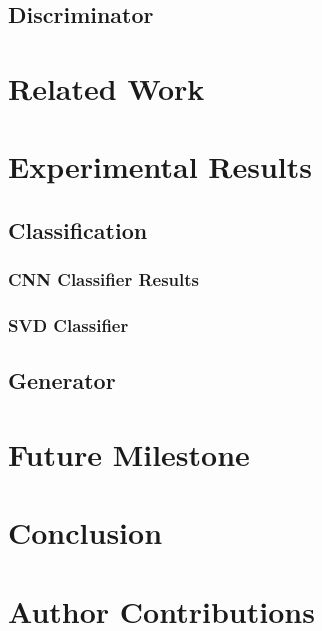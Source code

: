 \documentclass[11pt,letterpaper]{article}
\begin{document}
    \subsection{Discriminator}


\section{Related Work}
    \label{sec:related}

\section{Experimental Results}
    \label{sec:experimental}
    
    \subsection{Classification}
        \label{sub:exp_class}
        \subsubsection{CNN Classifier Results} %
        \label{ssub:CNN Classifier Results}
        
        \subsubsection{SVD Classifier} %
        \label{ssub:SVD Classifier}
        
        
    \subsection{Generator}
        \label{sub:exp_gen}

\section{Future Milestone}
    \label{sec:future}

\section{Conclusion}
    \label{sec:conclusion}

\section*{Author Contributions}
    \label{sec:contributions}
    

\nocite{*}

\end{document}
